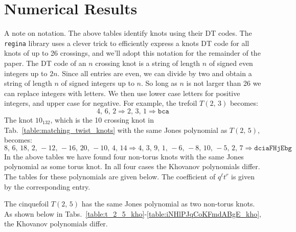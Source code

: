 \documentclass{article}
\theoremstyle{plain}
\begin{document}
    \section{Numerical Results}
        A note on notation. The above tables identify knots using their DT
        codes. The \texttt{regina} library uses a clever trick to efficiently
        express a knots DT code for all knots of up to 26 crossings, and we'll
        adopt this notation for the remainder of the paper. The DT code of an
        $n$ crossing knot is a string of length $n$ of signed even integers up
        to $2n$. Since all entries are even, we can divide by two and obtain
        a string of length $n$ of signed integers up to $n$. So long as $n$ is
        not larger than 26 we can replace integers with letters. We then use
        lower case letters for positive integers, and upper case for negative.
        For example, the trefoil $T(2,\,3)$ becomes:
        \begin{equation}
            4,\,6,\,2
            \Rightarrow
            2,\,3,\,1
            \Rightarrow
            \texttt{bca}
        \end{equation}
        The knot $10_{132}$, which is the 10 crossing knot in
        Tab.~\ref{table:matching_twist_knots} with the same Jones polynomial
        as $T(2,\,5)$, becomes:
        \begin{equation}
            8,\,6,\,18,\,2,\,-12,\,-16,\,20,\,-10,\,4,\,14
            \Rightarrow
            4,\,3,\,9,\,1,\,-6,\,-8,\,10,\,-5,\,2,\,7
            \Rightarrow
            \texttt{dciaFHjEbg}
        \end{equation}
        In the above tables we have found four non-torus knots with the same
        Jones polynomial as some torus knot. In all four cases the Khovanov
        polynomials differ. The tables for these polynomials are given below.
        The coefficient of $q^{\ell}t^{r}$ is given by the corresponding entry.
        \par\hfill\par
        The cinquefoil $T(2,\,5)$ has the same Jones polynomial as two
        non-torus knots. As shown below in
        Tabs.~\ref{table:t_2_5_kho}-\ref{table:iNHlPJqCoKFmdABgE_kho}, the
        Khovanov polynomials differ.
\end{document}
